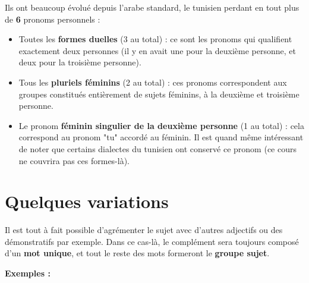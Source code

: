 Ils ont beaucoup évolué depuis l'arabe standard, le tunisien perdant en tout plus de \textbf{6} pronoms personnels :
\begin{itemize}
    \item Toutes les \textbf{formes duelles} (3 au total) :  ce sont les pronoms qui qualifient exactement deux personnes (il y en avait une pour la deuxième personne, et deux pour la troisième personne).
    \item Tous les \textbf{pluriels féminins} (2 au total) : ces pronoms correspondent aux groupes constitués entièrement de sujets féminins, à la deuxième et troisième personne.
    \item Le pronom \textbf{féminin singulier de la deuxième personne} (1 au total) : cela correspond au pronom "tu" accordé au féminin. Il est quand même intéressant de noter que certains dialectes du tunisien ont conservé ce pronom (ce cours ne couvrira pas ces formes-là).
\end{itemize}

\section{Quelques variations}
Il est tout à fait possible d'agrémenter le sujet avec d'autres adjectifs ou des démonstratifs par exemple. Dans ce cas-là, le complément sera toujours composé d'un \textbf{mot unique}, et tout le reste des mots formeront le \textbf{groupe sujet}.

\textbf{Exemples :}


